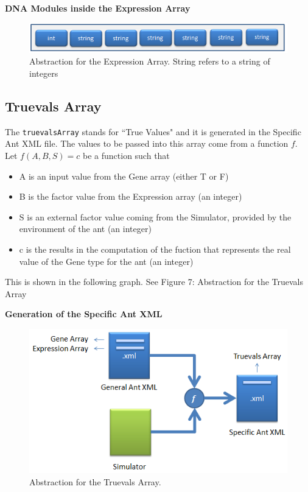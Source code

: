 \documentclass[titlepage, 12pt]{article}
\begin{document}
\begin{center}
{\bf DNA Modules inside the Expression Array}
\end{center}
 \vspace{-5 mm}
\begin{figure}[h!]
    \centering
    \includegraphics{expressionarray.png}
    \caption{Abstraction for the Expression Array. String refers to a string of integers}
\end{figure}


\subsection{Truevals Array}

The {\tt truevalsArray} stands for ``True Values" and it is generated in the Specific Ant XML file. The values to be passed into this array come from a function $f$. \\

 Let $f(A,B,S) = c$ be a function such that

\begin{itemize}
\item A is an input value from the Gene array (either T or F)
\item B is the factor value from the Expression array (an integer)
\item S is an external factor value coming from the Simulator, provided by the environment of the ant (an integer) 
\item c is the results in the computation of the fuction that represents the real value of the Gene type for the ant (an integer)
\end{itemize} 

This is shown in the following graph. See Figure 7: Abstraction for the Truevals Array

\newpage

\begin{center}
{\bf Generation of the Specific Ant XML}
\end{center}
 \vspace{-5 mm}
\begin{figure}[h!]
    \centering
    \includegraphics{specificchart.png}
    \caption{Abstraction for the Truevals Array.}
\end{figure}
\end{document}
